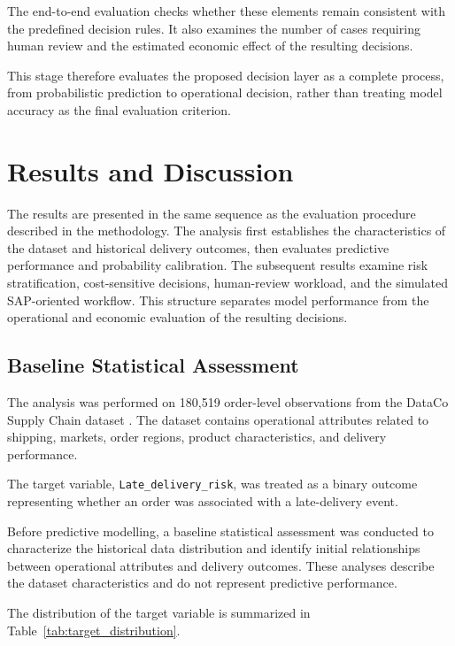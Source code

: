 \documentclass[10pt,a4paper]{article}
\providecommand{\Description}[1]{}
\begin{document}
The end-to-end evaluation checks whether these elements remain
consistent with the predefined decision rules. It also examines the
number of cases requiring human review and the estimated economic
effect of the resulting decisions.

This stage therefore evaluates the proposed decision layer as a
complete process, from probabilistic prediction to operational
decision, rather than treating model accuracy as the final evaluation
criterion.

\section{Results and Discussion}
The results are presented in the same sequence as the evaluation
procedure described in the methodology. The analysis first establishes
the characteristics of the dataset and historical delivery outcomes,
then evaluates predictive performance and probability calibration.
The subsequent results examine risk stratification, cost-sensitive
decisions, human-review workload, and the simulated SAP-oriented
workflow. This structure separates model performance from the
operational and economic evaluation of the resulting decisions.
\subsection{Baseline Statistical Assessment}

The analysis was performed on 180,519 order-level observations from the
DataCo Supply Chain dataset \cite{constante2019dataco}. The dataset
contains operational attributes related to shipping, markets, order
regions, product characteristics, and delivery performance.

The target variable, \texttt{Late\_delivery\_risk}, was treated as a
binary outcome representing whether an order was associated with a
late-delivery event.

Before predictive modelling, a baseline statistical assessment was
conducted to characterize the historical data distribution and identify
initial relationships between operational attributes and delivery
outcomes. These analyses describe the dataset characteristics and do
not represent predictive performance.

The distribution of the target variable is summarized in
Table~\ref{tab:target_distribution}.

\begin{table}[htbp]
\caption{Distribution of late-delivery risk classes.}
\Description{Table showing the distribution of late-delivery risk classes within the dataset, indicating the number of observations for each class category.}
\label{tab:target_distribution}
\centering

\end{table}
\end{document}

